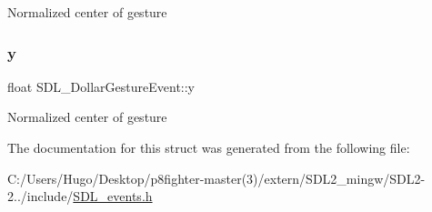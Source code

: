 Normalized center of gesture \mbox{\label{struct_s_d_l___dollar_gesture_event_a293b2303acc1cfc63c167c5525e6eab5}} 
\subsubsection{\texorpdfstring{y}{y}}
{\footnotesize\ttfamily float S\+D\+L\+\_\+\+Dollar\+Gesture\+Event\+::y}

Normalized center of gesture 

The documentation for this struct was generated from the following file\+:\begin{DoxyCompactItemize}
\item 
C\+:/\+Users/\+Hugo/\+Desktop/p8fighter-\/master(3)/extern/\+S\+D\+L2\+\_\+mingw/\+S\+D\+L2-\/2../include/\hyperlink{_s_d_l__events_8h}{S\+D\+L\+\_\+events.\+h}\end{DoxyCompactItemize}
